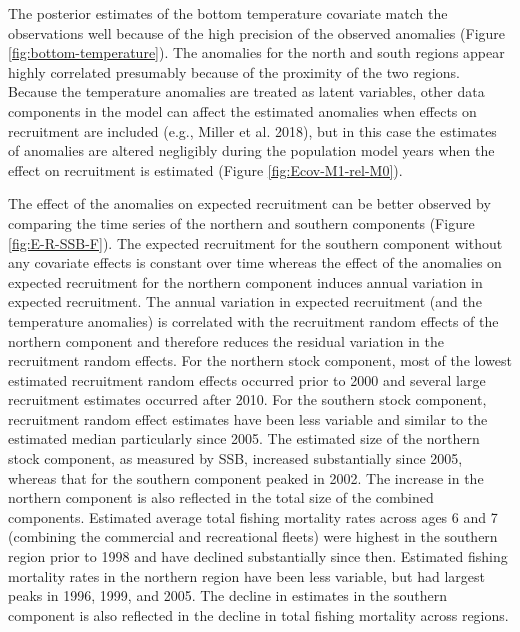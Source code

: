 \documentclass[
]{article}
\begin{document}
The posterior estimates of the bottom temperature covariate match the observations well because of the high precision of the observed anomalies (Figure \ref{fig:bottom-temperature}). The anomalies for the north and south regions appear highly correlated presumably because of the proximity of the two regions. Because the temperature anomalies are treated as latent variables, other data components in the model can affect the estimated anomalies when effects on recruitment are included (e.g., Miller et al. 2018), but in this case the estimates of anomalies are altered negligibly during the population model years when the effect on recruitment is estimated (Figure \ref{fig:Ecov-M1-rel-M0}).

The effect of the anomalies on expected recruitment can be better observed by comparing the time series of the northern and southern components (Figure \ref{fig:E-R-SSB-F}). The expected recruitment for the southern component without any covariate effects is constant over time whereas the effect of the anomalies on expected recruitment for the northern component induces annual variation in expected recruitment. The annual variation in expected recruitment (and the temperature anomalies) is correlated with the recruitment random effects of the northern component and therefore reduces the residual variation in the recruitment random effects. For the northern stock component, most of the lowest estimated recruitment random effects occurred prior to 2000 and several large recruitment estimates occurred after 2010. For the southern stock component, recruitment random effect estimates have been less variable and similar to the estimated median particularly since 2005. The estimated size of the northern stock component, as measured by SSB, increased substantially since 2005, whereas that for the southern component peaked in 2002. The increase in the northern component is also reflected in the total size of the combined components. Estimated average total fishing mortality rates across ages 6 and 7 (combining the commercial and recreational fleets) were highest in the southern region prior to 1998 and have declined substantially since then. Estimated fishing mortality rates in the northern region have been less variable, but had largest peaks in 1996, 1999, and 2005. The decline in estimates in the southern component is also reflected in the decline in total fishing mortality across regions.
\end{document}

